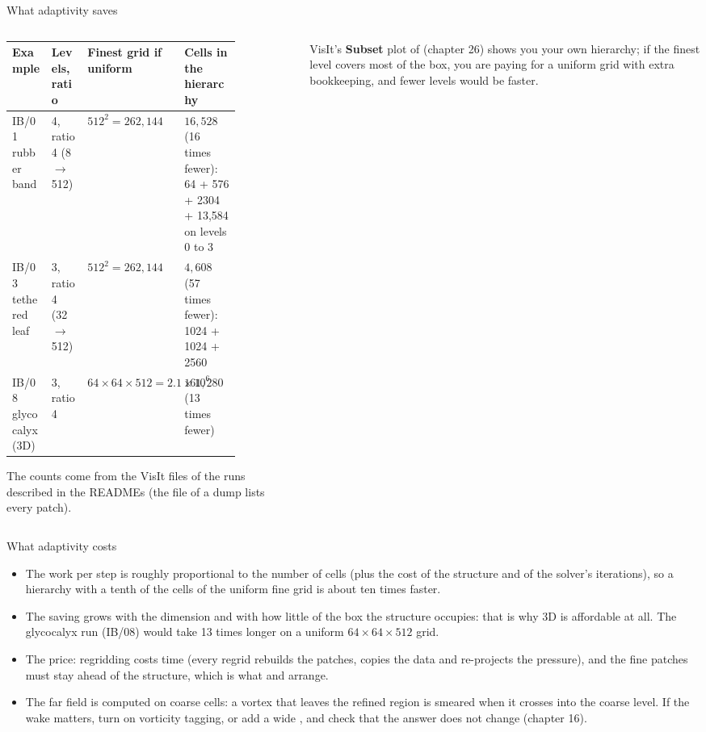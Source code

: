 \documentclass[aspectratio=169,11pt]{beamer}
\begin{document}
\begin{frame}{What adaptivity saves}
\begin{columns}[T,onlytextwidth]
\begin{column}{0.55\textwidth}
\scriptsize
\begin{tabular}{@{}L{0.18\linewidth}L{0.16\linewidth}L{0.2\linewidth}L{0.26\linewidth}@{}}
\toprule
Example & Levels, ratio & Finest grid if uniform & Cells in the hierarchy\\
\midrule
IB/01 rubber band & 4, ratio 4 (8 $\to$ 512) & $512^2 = 262{,}144$ & $16{,}528$ (16 times fewer): 64 + 576 + 2304 + 13,584 on levels 0 to 3\\
IB/03 tethered leaf & 3, ratio 4 (32 $\to$ 512) & $512^2 = 262{,}144$ & $4{,}608$ (57 times fewer): 1024 + 1024 + 2560\\
IB/08 glycocalyx (3D) & 3, ratio 4 & $64\times64\times512 = 2.1\times10^6$ & $161{,}280$ (13 times fewer)\\
\bottomrule
\end{tabular}
\vspace{1mm}
\footnotesize The counts come from the VisIt files of the runs described in the READMEs (the  file of a dump lists every patch).
\end{column}
\begin{column}{0.43\textwidth}
\begin{punchbox}
\small VisIt's \textbf{Subset} plot of  (chapter 26) shows you your own hierarchy; if the finest level covers most of the box, you are paying for a uniform grid with extra bookkeeping, and fewer levels would be faster.
\end{punchbox}
\end{column}
\end{columns}
\end{frame}

\begin{frame}{What adaptivity costs}
\begin{itemize}
  \item The work per step is roughly proportional to the number of cells (plus the cost of the structure and of the solver's iterations), so a hierarchy with a tenth of the cells of the uniform fine grid is about ten times faster.
  \item The saving grows with the dimension and with how little of the box the structure occupies: that is why 3D is affordable at all. The glycocalyx run (IB/08) would take 13 times longer on a uniform $64\times64\times512$ grid.
  \item The price: regridding costs time (every regrid rebuilds the patches, copies the data and re-projects the pressure), and the fine patches must stay ahead of the structure, which is what  and  arrange.
  \item The far field is computed on coarse cells: a vortex that leaves the refined region is smeared when it crosses into the coarse level. If the wake matters, turn on vorticity tagging, or add a wide , and check that the answer does not change (chapter 16).
\end{itemize}
\end{frame}
\end{document}
